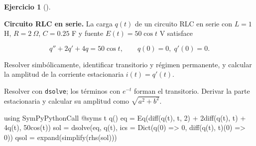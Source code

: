\documentclass[
  spanish,
  a4paper,
]{scrreport}
\newenvironment{Shaded}{\begin{snugshade}}{\end{snugshade}}
\newcommand{\BuiltInTok}[1]{\textcolor[rgb]{0.00,0.23,0.31}{#1}}
\newcommand{\FloatTok}[1]{\textcolor[rgb]{0.68,0.00,0.00}{#1}}
\newcommand{\FunctionTok}[1]{\textcolor[rgb]{0.28,0.35,0.67}{#1}}
\newcommand{\ImportTok}[1]{\textcolor[rgb]{0.00,0.46,0.62}{#1}}
\newcommand{\NormalTok}[1]{\textcolor[rgb]{0.00,0.23,0.31}{#1}}
\newcommand{\OperatorTok}[1]{\textcolor[rgb]{0.37,0.37,0.37}{#1}}
\newcommand{\PreprocessorTok}[1]{\textcolor[rgb]{0.68,0.00,0.00}{#1}}
\theoremstyle{definition}
\newtheorem{exercise}{Ejercicio}[chapter]
\theoremstyle{remark}
\begin{document}
\begin{exercise}[]\protect\hypertarget{exr-rlc}{}\label{exr-rlc}

\textbf{Circuito RLC en serie.} La carga \(q(t)\) de un circuito RLC en
serie con \(L = 1\) H, \(R = 2\ \Omega\), \(C = 0.25\) F y fuente
\(E(t) = 50\cos t\) V satisface

\[
q'' + 2q' + 4q = 50\cos t, \qquad q(0) = 0,\; q'(0) = 0.
\]

Resolver simbólicamente, identificar transitorio y régimen permanente, y
calcular la amplitud de la corriente estacionaria \(i(t) = q'(t)\).

\begin{tcolorbox}[enhanced jigsaw, arc=.35mm, bottomrule=.15mm, bottomtitle=1mm, breakable, colback=white, colbacktitle=quarto-callout-note-color!10!white, colframe=quarto-callout-note-color-frame, coltitle=black, left=2mm, leftrule=.75mm, opacityback=0, opacitybacktitle=0.6, rightrule=.15mm, title=\textcolor{quarto-callout-note-color}{\faInfo}\hspace{0.5em}{Ayuda}, titlerule=0mm, toprule=.15mm, toptitle=1mm]

Resolver con \texttt{dsolve}; los términos con \(e^{-t}\) forman el
transitorio. Derivar la parte estacionaria y calcular su amplitud como
\(\sqrt{a^2+b^2}\).

\end{tcolorbox}

\begin{tcolorbox}[enhanced jigsaw, arc=.35mm, bottomrule=.15mm, bottomtitle=1mm, breakable, colback=white, colbacktitle=quarto-callout-tip-color!10!white, colframe=quarto-callout-tip-color-frame, coltitle=black, left=2mm, leftrule=.75mm, opacityback=0, opacitybacktitle=0.6, rightrule=.15mm, title=\textcolor{quarto-callout-tip-color}{\faLightbulb}\hspace{0.5em}{Solución}, titlerule=0mm, toprule=.15mm, toptitle=1mm]

\begin{Shaded}
\begin{Highlighting}[]
\ImportTok{using} \BuiltInTok{SymPyPythonCall}
\PreprocessorTok{@syms}\NormalTok{ t }\FunctionTok{q}\NormalTok{()}
\NormalTok{eq }\OperatorTok{=} \FunctionTok{Eq}\NormalTok{(}\FunctionTok{diff}\NormalTok{(}\FunctionTok{q}\NormalTok{(t), t, }\FloatTok{2}\NormalTok{) }\OperatorTok{+} \FloatTok{2}\FunctionTok{diff}\NormalTok{(}\FunctionTok{q}\NormalTok{(t), t) }\OperatorTok{+} \FloatTok{4}\FunctionTok{q}\NormalTok{(t), }\FloatTok{50}\FunctionTok{cos}\NormalTok{(t))}
\NormalTok{sol }\OperatorTok{=} \FunctionTok{dsolve}\NormalTok{(eq, }\FunctionTok{q}\NormalTok{(t), ics }\OperatorTok{=} \FunctionTok{Dict}\NormalTok{(}\FunctionTok{q}\NormalTok{(}\FloatTok{0}\NormalTok{) }\OperatorTok{=\textgreater{}} \FloatTok{0}\NormalTok{, }\FunctionTok{diff}\NormalTok{(}\FunctionTok{q}\NormalTok{(t), t)(}\FloatTok{0}\NormalTok{) }\OperatorTok{=\textgreater{}} \FloatTok{0}\NormalTok{))}
\NormalTok{qsol }\OperatorTok{=} \FunctionTok{expand}\NormalTok{(}\FunctionTok{simplify}\NormalTok{(}\FunctionTok{rhs}\NormalTok{(sol)))}
\end{Highlighting}
\end{Shaded}


\end{tcolorbox}
\end{exercise}
\end{document}
